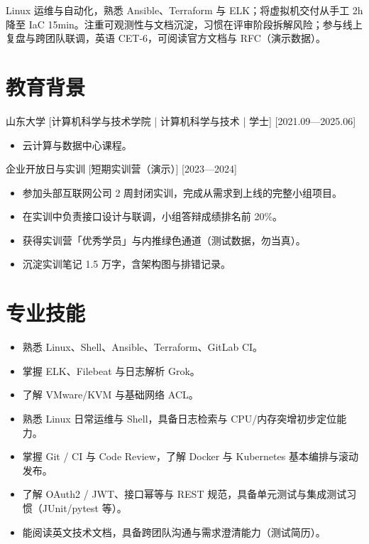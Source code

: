\documentclass{resume-photo}
\begin{document}

\ResumeTitle

\noindent Linux 运维与自动化，熟悉 Ansible、Terraform 与 ELK；将虚拟机交付从手工 2h 降至 IaC 15min。注重可观测性与文档沉淀，习惯在评审阶段拆解风险；参与线上复盘与跨团队联调，英语 CET-6，可阅读官方文档与 RFC（演示数据）。

\section{教育背景}
\ResumeItem
{山东大学}
[\textnormal{计算机科学与技术学院 | 计算机科学与技术 | 学士}]
[2021.09—2025.06]

\begin{itemize}
  \item 云计算与数据中心课程。
\end{itemize}


\ResumeItem
{企业开放日与实训}
[\textnormal{短期实训营（演示）}]
[2023—2024]

\begin{itemize}
  \item 参加头部互联网公司 2 周封闭实训，完成从需求到上线的完整小组项目。
  \item 在实训中负责接口设计与联调，小组答辩成绩排名前 20\%。
  \item 获得实训营「优秀学员」与内推绿色通道（测试数据，勿当真）。
  \item 沉淀实训笔记 1.5 万字，含架构图与排错记录。
\end{itemize}



\section{专业技能}
\begin{itemize}
  \item 熟悉 Linux、Shell、Ansible、Terraform、GitLab CI。
  \item 掌握 ELK、Filebeat 与日志解析 Grok。
  \item 了解 VMware/KVM 与基础网络 ACL。
  \item 熟悉 Linux 日常运维与 Shell，具备日志检索与 CPU/内存突增初步定位能力。
  \item 掌握 Git / CI 与 Code Review，了解 Docker 与 Kubernetes 基本编排与滚动发布。
  \item 了解 OAuth2 / JWT、接口幂等与 REST 规范，具备单元测试与集成测试习惯（JUnit/pytest 等）。
  \item 能阅读英文技术文档，具备跨团队沟通与需求澄清能力（测试简历）。
\end{itemize}
\end{document}
